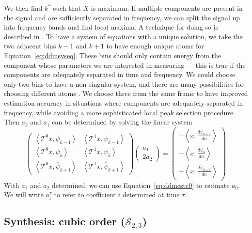 We then find $k^{\ast}$ such that $X$ is maximum. If multiple components
are present in the signal and are sufficiently separated in frequency, we can
split the signal up into frequency bands and find local maxima. A technique for
doing so is described in \cite[p.~42]{serra1989system}. To have a system of
equations with a unique solution, we take the two adjacent bins $k-1$ and $k+1$
to have enough unique atoms for Equation~\ref{eq:ddmsyseq}. These bins should
only contain energy from the component whose parameters we are interested in
measuring --- this is true if the components are adequately separated in time
and frequency. We could choose only two bins to have a non-singular system, and
there are many possibilities for choosing different atoms
\cite[p.~4639]{betser2009sinusoidal}. We choose three from the same frame to
have improved estimation accuracy in situations where components are adequately
separated in frequency, while avoiding a more sophisticated local peak selection
procedure. Then $a_2$ and $a_1$ can be determined by solving the linear system
\[
    \begin{pmatrix}
        \left\langle \mathcal{T}^{0} x , \overline{\psi}_{k-1} \right\rangle &
        \left\langle \mathcal{T}^{1} x , \overline{\psi}_{k-1} \right\rangle \\
        \left\langle \mathcal{T}^{0} x , \overline{\psi}_{k} \right\rangle &
        \left\langle \mathcal{T}^{1} x , \overline{\psi}_{k} \right\rangle \\
        \left\langle \mathcal{T}^{0} x , \overline{\psi}_{k+1} \right\rangle & 
        \left\langle \mathcal{T}^{1} x , \overline{\psi}_{k+1} \right\rangle
    \end{pmatrix}
    \begin{pmatrix}
        a_{1} \\
        2a_{2}
    \end{pmatrix}
    =
    \begin{pmatrix}
        -\left\langle  x , \frac{d\overline{\psi}_{k-1}}{dn} \right\rangle \\
        -\left\langle  x , \frac{d\overline{\psi}_{k}}{dn} \right\rangle \\
        -\left\langle  x , \frac{d\overline{\psi}_{k+1}}{dn} \right\rangle
    \end{pmatrix}
\]
With $a_{1}$ and $a_{2}$ determined, we can use Equation~\ref{eq:ddmestc0} to
estimate $a_0$. We will write $a^{\tau}_{i}$ to refer to coefficient $i$
determined at time $\tau$.

\subsection{Synthesis: cubic order ($\mathscr{S}_{2,3}$)
\label{sec:s23synthesis}}

